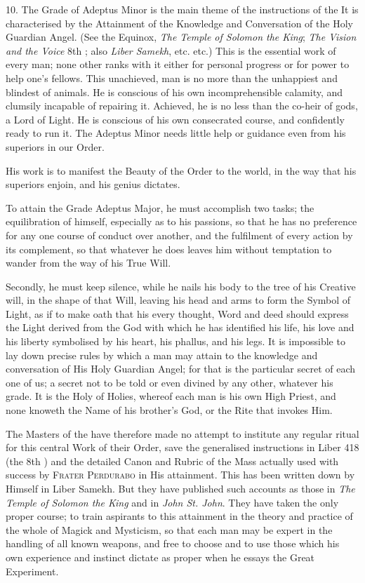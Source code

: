 \vspace{\baselineskip}

10. The Grade of Adeptus Minor is the main theme of the instructions of the \Argentium{} It is characterised by the Attainment of the Knowledge and Conversation of the Holy Guardian Angel. (See the Equinox, \textit{The Temple of Solomon the King}; \textit{The Vision and the Voice} 8th \AEthyr{}; also \textit{Liber Samekh}, etc. etc.) This is the essential work of every man; none other ranks with it either for personal progress or for power to help one's fellows. This unachieved, man is no more than the unhappiest and blindest of animals. He is conscious of his own incomprehensible calamity, and clumsily incapable of repairing it. Achieved, he is no less than the co-heir of gods, a Lord of Light. He is conscious of his own consecrated course, and confidently ready to run it. The Adeptus Minor needs little help or guidance even from his superiors in our Order.

His work is to manifest the Beauty of the Order to the world, in the way that his superiors enjoin, and his genius dictates.

To attain the Grade Adeptus Major, he must accomplish two tasks; the equilibration of himself, especially as to his passions, so that he has no preference for any one course of conduct over another, and the fulfilment of every action by its complement, so that whatever he does leaves him without temptation to wander from the way of his True Will.

Secondly, he must keep silence, while he nails his body to the tree of his Creative will, in the shape of that Will, leaving his head and arms to form the Symbol of Light, as if to make oath that his every thought, Word and deed should express the Light derived from the God with which he has identified his life, his love and his liberty \textemdash{} symbolised by his heart, his phallus, and his legs. It is impossible to lay down precise rules by which a man may attain to the knowledge and conversation of His Holy Guardian Angel; for that is the particular secret of each one of us; a secret not to be told or even divined by any other, whatever his grade. It is the Holy of Holies, whereof each man is his own High Priest, and none knoweth the Name of his brother's God, or the Rite that invokes Him.

The Masters of the \Argentium{} have therefore made no attempt to institute any regular ritual for this central Work of their Order, save the generalised instructions in Liber 418 (the 8th \AEthyr{}\index{\AEthyr{}|)}) and the detailed Canon and Rubric of the Mass actually used with success by \textsc{Frater Perdurabo} in His attainment. This has been written down by Himself in Liber Samekh. But they have published such accounts as those in \textit{The Temple of Solomon the King} and in \textit{John St. John}. They have taken the only proper course; to train aspirants to this attainment in the theory and practice of the whole of Magick and Mysticism, so that each man may be expert in the handling of all known weapons, and free to choose and to use those which his own experience and instinct dictate as proper when he essays the Great Experiment.

